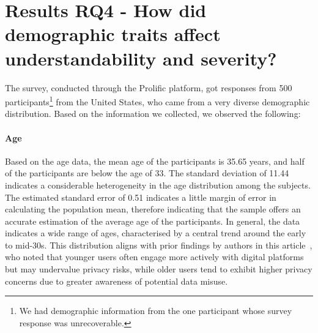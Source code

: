 \section*{Results RQ4 - How did demographic traits affect understandability and severity?}





The survey, conducted through the Prolific platform, got responses from 500 participants\footnote{We had demographic information from the one participant whose survey response was unrecoverable.} from the United States, who came from a very diverse demographic distribution.
Based on the information we collected, we observed the following:

\paragraph{Age} 
Based on the age data, the mean age of the participants is 35.65 years, and half of the participants are below the age of 33.
The standard deviation of 11.44 indicates a considerable heterogeneity in the age distribution among the subjects.
The estimated standard error of 0.51 indicates a little margin of error in calculating the population mean, therefore indicating that the sample offers an accurate estimation of the average age of the participants.
In general, the data indicates a wide range of ages, characterised by a central trend around the early to mid-30s.
This distribution aligns with prior findings by authors in this article~\cite{lythreatis2022digital}, who noted that younger users often engage more actively with digital platforms but may undervalue privacy risks, while older users tend to exhibit higher privacy concerns due to greater awareness of potential data misuse.

